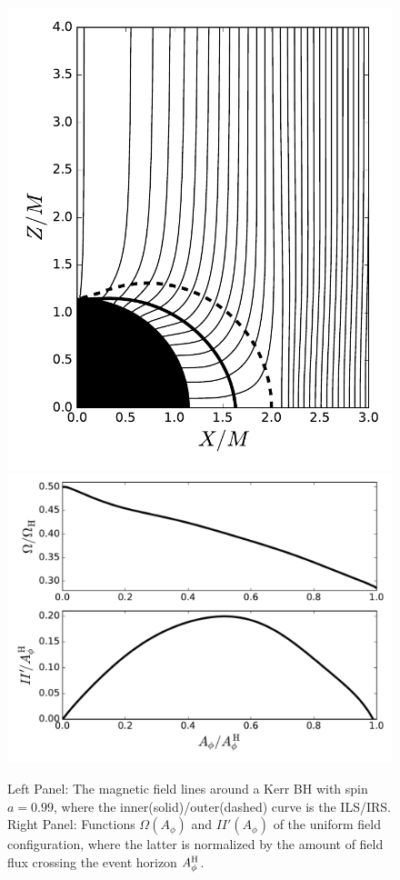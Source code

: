 \documentclass[iop,apj]{emulateapj}
\def\AB{A_\phi^{\rm H}}
\begin{document}
\begin{figure}
    \centering
\includegraphics[scale=0.45]{f1a}%
\includegraphics[scale=0.44]{f1b}
\caption{Left Panel: The magnetic field lines around a Kerr BH with spin $a=0.99$,
where the inner(solid)/outer(dashed) curve is the ILS/IRS.
Right Panel: Functions $\Omega(A_\phi)$ and $II'(A_\phi)$ of the uniform field configuration,
where the latter is normalized by the amount of field flux crossing the event horizon $\AB$.}
\label{fig:lines}
\end{figure}
\end{document}
